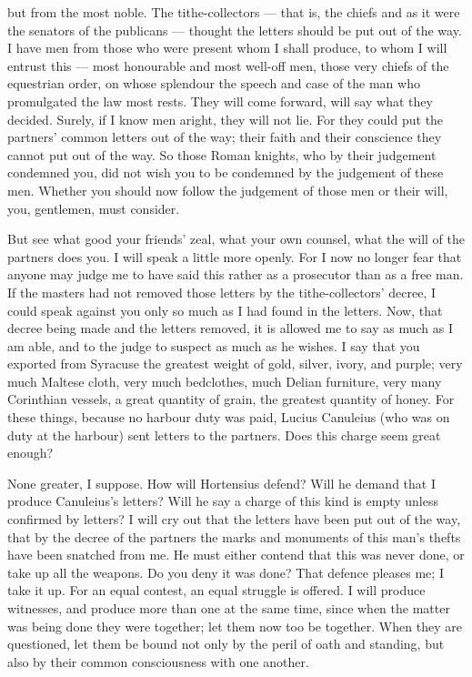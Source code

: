  but from the most noble. The tithe-collectors --- that is, the chiefs and as it were the senators of the publicans --- thought the letters should be put out of the way. I have men from those who were present whom I shall produce, to whom I will entrust this --- most honourable and most well-off men, those very chiefs of the equestrian order, on whose splendour the speech and case of the man who promulgated the law most rests. They will come forward, will say what they decided. Surely, if I know men aright, they will not lie. For they could put the partners' common letters out of the way; their faith and their conscience they cannot put out of the way. So those Roman knights, who by their judgement condemned you, did not wish you to be condemned by the judgement of these men. Whether you should now follow the judgement of those men or their will, you, gentlemen, must consider.

 But see what good your friends' zeal, what your own counsel, what the will of the partners does you. I will speak a little more openly. For I now no longer fear that anyone may judge me to have said this rather as a prosecutor than as a free man. If the masters had not removed those letters by the tithe-collectors' decree, I could speak against you only so much as I had found in the letters. Now, that decree being made and the letters removed, it is allowed me to say as much as I am able, and to the judge to suspect as much as he wishes. I say that you exported from Syracuse the greatest weight of gold, silver, ivory, and purple; very much Maltese cloth, very much bedclothes, much Delian furniture, very many Corinthian vessels, a great quantity of grain, the greatest quantity of honey. For these things, because no harbour duty was paid, Lucius Canuleius (who was on duty at the harbour) sent letters to the partners. Does this charge seem great enough?

 None greater, I suppose. How will Hortensius defend? Will he demand that I produce Canuleius's letters? Will he say a charge of this kind is empty unless confirmed by letters? I will cry out that the letters have been put out of the way, that by the decree of the partners the marks and monuments of this man's thefts have been snatched from me. He must either contend that this was never done, or take up all the weapons. Do you deny it was done? That defence pleases me; I take it up. For an equal contest, an equal struggle is offered. I will produce witnesses, and produce more than one at the same time, since when the matter was being done they were together; let them now too be together. When they are questioned, let them be bound not only by the peril of oath and standing, but also by their common consciousness with one another.

